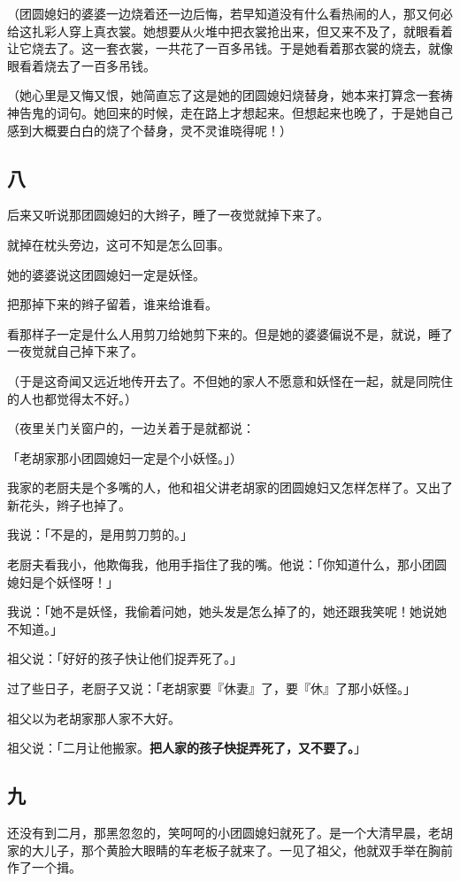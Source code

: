 \documentclass[UTF8]{ctexart}
\begin{document}
（团圆媳妇的婆婆一边烧着还一边后悔，若早知道没有什么看热闹的人，那又何必给这扎彩人穿上真衣裳。她想要从火堆中把衣裳抢出来，但又来不及了，就眼看着让它烧去了。这一套衣裳，一共花了一百多吊钱。于是她看着那衣裳的烧去，就像眼看着烧去了一百多吊钱。

（她心里是又悔又恨，她简直忘了这是她的团圆媳妇烧替身，她本来打算念一套祷神告鬼的词句。她回来的时候，走在路上才想起来。但想起来也晚了，于是她自己感到大概要白白的烧了个替身，灵不灵谁晓得呢！）

\subsection{八}

后来又听说那团圆媳妇的大辫子，睡了一夜觉就掉下来了。

就掉在枕头旁边，这可不知是怎么回事。

她的婆婆说这团圆媳妇一定是妖怪。

把那掉下来的辫子留着，谁来给谁看。

看那样子一定是什么人用剪刀给她剪下来的。但是她的婆婆偏说不是，就说，睡了一夜觉就自己掉下来了。

（于是这奇闻又远近地传开去了。不但她的家人不愿意和妖怪在一起，就是同院住的人也都觉得太不好。）

（夜里关门关窗户的，一边关着于是就都说：

「老胡家那小团圆媳妇一定是个小妖怪。」）

我家的老厨夫是个多嘴的人，他和祖父讲老胡家的团圆媳妇又怎样怎样了。又出了新花头，辫子也掉了。

我说：「不是的，是用剪刀剪的。」

老厨夫看我小，他欺侮我，他用手指住了我的嘴。他说：「你知道什么，那小团圆媳妇是个妖怪呀！」

我说：「她不是妖怪，我偷着问她，她头发是怎么掉了的，她还跟我笑呢！她说她不知道。」

祖父说：「好好的孩子快让他们捉弄死了。」

过了些日子，老厨子又说：「老胡家要『休妻』了，要『休』了那小妖怪。」

祖父以为老胡家那人家不大好。

祖父说：「二月让他搬家。\textbf{把人家的孩子快捉弄死了，又不要了。}」

\subsection{九}

还没有到二月，那黑忽忽的，笑呵呵的小团圆媳妇就死了。是一个大清早晨，老胡家的大儿子，那个黄脸大眼睛的车老板子就来了。一见了祖父，他就双手举在胸前作了一个揖。
\end{document}
